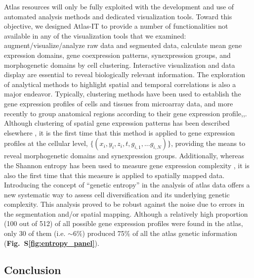 Atlas resources will only be fully exploited with the development and use of automated analysis methods and dedicated visualization tools. Toward this objective, we designed Atlas-IT to provide a number of functionalities not available in any of the visualization tools that we examined: augment/visualize/analyze raw data and segmented data, calculate mean gene expression domains, gene coexpression patterns, synexpression groups, and morphogenetic domains by cell clustering. Interactive visualization and data display are essential to reveal biologically relevant information. The exploration of analytical methods to highlight spatial and temporal correlations is also a major endeavor. Typically, clustering methods have been used to establish the gene expression profiles of cells and tissues from microarray data, and more recently to group anatomical regions according to their gene expression profile\cite{lein2007genome},\cite{fisher2008integrating},\cite{frise2010systematic}. Although clustering of spatial gene expression patterns has been described elsewhere \cite{venkataraman2008emage}, it is the first time that this method is applied to gene expression profiles at the cellular level, $\{(x_i,y_i,z_i,t,g_{i,1},...g_{i,N})\}$, providing the means to reveal morphogenetic domains and synexpression groups. Additionally, whereas the Shannon entropy has been used to measure gene expression complexity \cite{martinez2008defining}, it is also the first time that this measure is applied to spatially mapped data. Introducing the concept of ``genetic entropy'' in the analysis of atlas data offers a new systematic way to assess cell diversification and its underlying genetic complexity. This analysis proved to be robust against the noise due to errors in the segmentation and/or spatial mapping. Although a relatively high proportion (100 out of 512) of all possible gene expression profiles were found in the atlas, only 30 of them (i.e. $\sim6\%$) produced 75\% of all the atlas genetic information (\textbf{Fig.~S\ref{fig:entropy_panel}}).

\subsection*{Conclusion}


